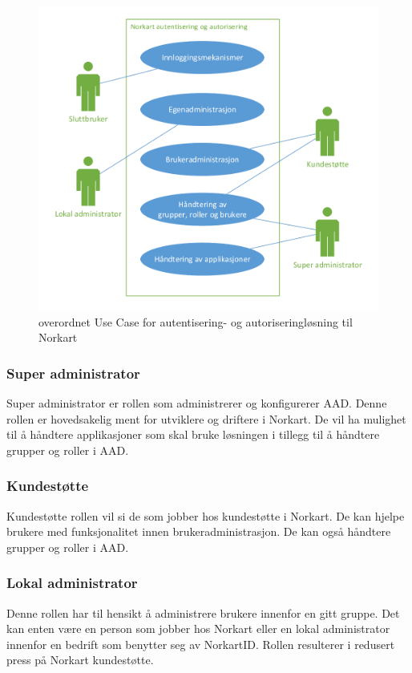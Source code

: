 \begin{figure}[h]
    \begin{center}
        \includegraphics[scale=0.65]{graphics/OverordnetUseCase}
        \caption{overordnet Use Case for autentisering- og autoriseringløsning til Norkart}
        \label{fig:OverordnetUseCase}
        \end{center}
\end{figure}

\subsubsection*{Super administrator}
Super administrator er rollen som administrerer og konfigurerer AAD. Denne rollen er hovedsakelig ment for utviklere og driftere i Norkart. De vil ha mulighet til å håndtere applikasjoner som skal bruke løsningen i tillegg til å håndtere grupper og roller i AAD. 

\subsubsection*{Kundestøtte}
Kundestøtte rollen vil si de som jobber hos kundestøtte i Norkart. De kan hjelpe brukere med funksjonalitet innen brukeradministrasjon. De kan også håndtere grupper og roller i AAD.

\subsubsection*{Lokal administrator}
Denne rollen har til hensikt å administrere brukere innenfor en gitt gruppe. Det kan enten være en person som jobber hos Norkart eller en lokal administrator innenfor en bedrift som benytter seg av NorkartID. Rollen resulterer i redusert press på Norkart kundestøtte.

